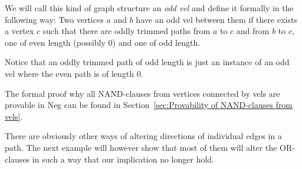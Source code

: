 We will call this kind of graph structure an \textit{odd vel} and define it formally in the following way:
Two vertices $a$ and $b$ have an odd vel between them if there exists a vertex $c$ such that there are oddly trimmed paths from $a$ to $c$ and from $b$ to $c$, one of even length (possibly 0) and one of odd length.

Notice that an oddly trimmed path of odd length is just an instance of an odd vel where the even path is of length 0.

The formal proof why all NAND-clauses from vertices connected by vels are provable in Neg can be found in Section~\ref{sec:Provability of NAND-clauses from vels}.

There are obviously other ways of altering directions of individual edges in a path.
The next example will however show that most of them will alter the OR-clauses in such a way that our implication no longer hold.

